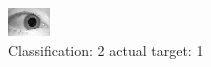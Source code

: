 \begin{figure}[h!]
\begin{center}
\includegraphics[width=0.60\columnwidth]{figures/ID1460_class_2_target_1.png}
\end{center}
\caption{ Classification: 2 actual target: 1}
\label{fig:ID1460_class_2_target_1}
\end{figure}
